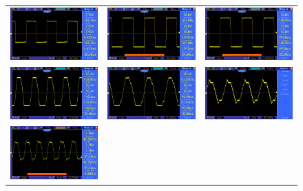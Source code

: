 \documentclass[14pt,a4paper]{extarticle}
\begin{document}
\begin{figure}[H]
\centering
\begin{tabular}{ccc}
    \includegraphics[width=0.32\linewidth]{imgs/square100.png}&
    \includegraphics[width=0.32\linewidth]{imgs/square500.png}&
    \includegraphics[width=0.32\linewidth]{imgs/square1k.png}\\
    \includegraphics[width=0.32\linewidth]{imgs/square7k.png}&
    \includegraphics[width=0.32\linewidth]{imgs/square10k.png}&        
    \includegraphics[width=0.32\linewidth]{imgs/square30k.png}\\
    \includegraphics[width=0.32\linewidth]{imgs/square47k.png}&

\end{tabular}
\end{figure}
\end{document}
